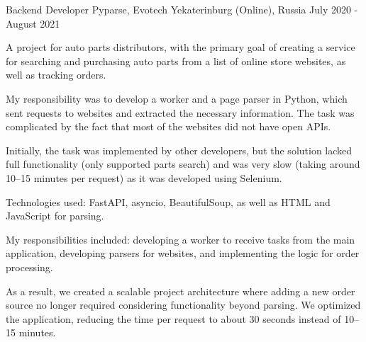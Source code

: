 

\begin{cventries}

  \cventry
    {Backend Developer} %
    {Pyparse, Evotech} %
    {Yekaterinburg (Online), Russia} %
    {July 2020 - August 2021} %
    {
      \begin{cvitems} %
        \item {A project for auto parts distributors, with the primary goal of creating a service for searching and purchasing auto parts from a list of online store websites, as well as tracking orders.}
        \item {My responsibility was to develop a worker and a page parser in Python, which sent requests to websites and extracted the necessary information. The task was complicated by the fact that most of the websites did not have open APIs.}
        \item {Initially, the task was implemented by other developers, but the solution lacked full functionality (only supported parts search) and was very slow (taking around 10–15 minutes per request) as it was developed using Selenium.}
        \item {Technologies used: FastAPI, asyncio, BeautifulSoup, as well as HTML and JavaScript for parsing.}
        \item {My responsibilities included: developing a worker to receive tasks from the main application, developing parsers for websites, and implementing the logic for order processing.}
        \item {As a result, we created a scalable project architecture where adding a new order source no longer required considering functionality beyond parsing. We optimized the application, reducing the time per request to about 30 seconds instead of 10–15 minutes.}
      \end{cvitems}
    }


\end{cventries}
